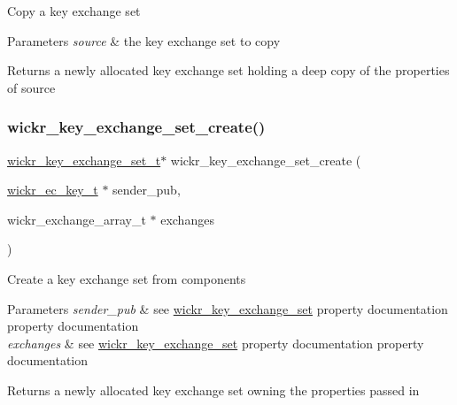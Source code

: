 Copy a key exchange set


\begin{DoxyParams}{Parameters}
{\em source} & the key exchange set to copy \\
\hline
\end{DoxyParams}
\begin{DoxyReturn}{Returns}
a newly allocated key exchange set holding a deep copy of the properties of \textquotesingle{}source\textquotesingle{} 
\end{DoxyReturn}
\mbox{\label{group__wickr__key__exchange__set_ga9d247f82fda4d9ad7cb6784cd591c90e}} 
\subsubsection{\texorpdfstring{wickr\_key\_exchange\_set\_create()}{wickr\_key\_exchange\_set\_create()}}
{\footnotesize\ttfamily \mbox{\hyperlink{structwickr__key__exchange__set}{wickr\+\_\+key\+\_\+exchange\+\_\+set\+\_\+t}}$\ast$ wickr\+\_\+key\+\_\+exchange\+\_\+set\+\_\+create (\begin{DoxyParamCaption}\item[{\mbox{\hyperlink{structwickr__ec__key}{wickr\+\_\+ec\+\_\+key\+\_\+t}} $\ast$}]{sender\+\_\+pub,  }\item[{wickr\+\_\+exchange\+\_\+array\+\_\+t $\ast$}]{exchanges }\end{DoxyParamCaption})}

Create a key exchange set from components


\begin{DoxyParams}{Parameters}
{\em sender\+\_\+pub} & see \textquotesingle{}\mbox{\hyperlink{structwickr__key__exchange__set}{wickr\+\_\+key\+\_\+exchange\+\_\+set}}\textquotesingle{} property documentation property documentation \\
\hline
{\em exchanges} & see \textquotesingle{}\mbox{\hyperlink{structwickr__key__exchange__set}{wickr\+\_\+key\+\_\+exchange\+\_\+set}}\textquotesingle{} property documentation property documentation \\
\hline
\end{DoxyParams}
\begin{DoxyReturn}{Returns}
a newly allocated key exchange set owning the properties passed in 
\end{DoxyReturn}
\mbox{\label{group__wickr__key__exchange__set_gaec93a83e2f00a707caf371b340591324}} 
